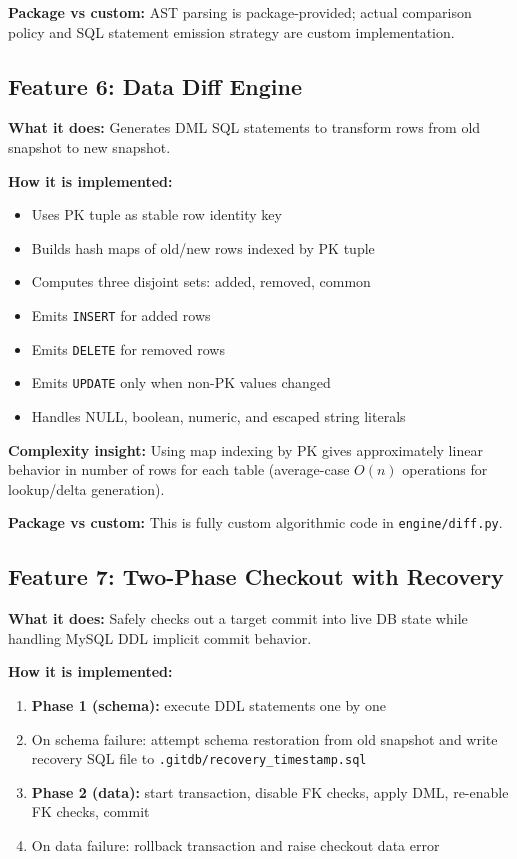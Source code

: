 \documentclass[12pt, a4paper]{article}
\begin{document}
\textbf{Package vs custom:}
AST parsing is package-provided; actual comparison policy and SQL statement
emission strategy are custom implementation.

\subsection{Feature 6: Data Diff Engine}

\textbf{What it does:}
Generates DML SQL statements to transform rows from old snapshot to new snapshot.

\textbf{How it is implemented:}
\begin{itemize}[leftmargin=1.5em]
    \item Uses PK tuple as stable row identity key
    \item Builds hash maps of old/new rows indexed by PK tuple
    \item Computes three disjoint sets: added, removed, common
    \item Emits \texttt{INSERT} for added rows
    \item Emits \texttt{DELETE} for removed rows
    \item Emits \texttt{UPDATE} only when non-PK values changed
    \item Handles NULL, boolean, numeric, and escaped string literals
\end{itemize}

\textbf{Complexity insight:}
Using map indexing by PK gives approximately linear behavior in number of rows
for each table (average-case $O(n)$ operations for lookup/delta generation).

\textbf{Package vs custom:}
This is fully custom algorithmic code in \texttt{engine/diff.py}.

\subsection{Feature 7: Two-Phase Checkout with Recovery}

\textbf{What it does:}
Safely checks out a target commit into live DB state while handling MySQL DDL
implicit commit behavior.

\textbf{How it is implemented:}
\begin{enumerate}[leftmargin=1.5em]
    \item \textbf{Phase 1 (schema):} execute DDL statements one by one
    \item On schema failure: attempt schema restoration from old snapshot and write
    recovery SQL file to \texttt{.gitdb/recovery\_timestamp.sql}
    \item \textbf{Phase 2 (data):} start transaction, disable FK checks, apply DML,
    re-enable FK checks, commit
    \item On data failure: rollback transaction and raise checkout data error
\end{enumerate}
\end{document}
